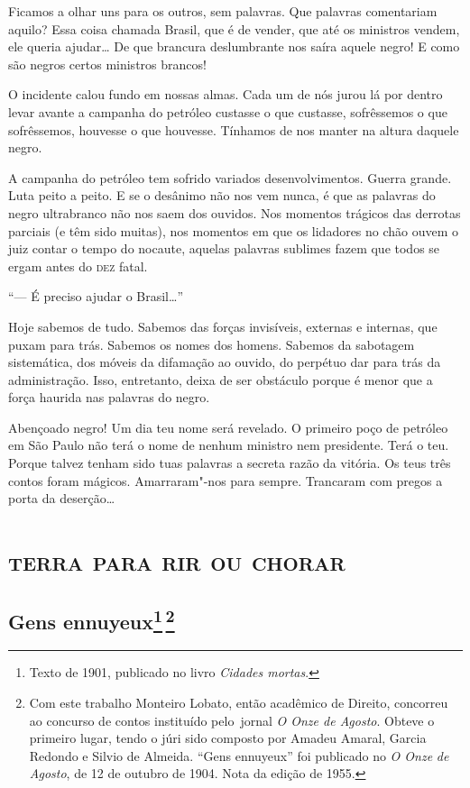 Ficamos a olhar uns para os outros, sem palavras. Que palavras
comentariam aquilo? Essa coisa chamada Brasil, que é de vender, que até
os ministros vendem, ele queria ajudar\ldots{} De que brancura deslumbrante
nos saíra aquele negro! E como são negros certos ministros brancos!

O incidente calou fundo em nossas almas. Cada um de nós jurou lá por
dentro levar avante a campanha do petróleo custasse o que custasse,
sofrêssemos o que sofrêssemos, houvesse o que houvesse. Tínhamos de nos
manter na altura daquele negro.

A campanha do petróleo tem sofrido variados desenvolvimentos. Guerra
grande. Luta peito a peito. E se o desânimo não nos vem nunca, é que as
palavras do negro ultrabranco não nos saem dos ouvidos. Nos momentos
trágicos das derrotas parciais (e têm sido muitas), nos momentos em que
os lidadores no chão ouvem o juiz contar o tempo do nocaute, aquelas
palavras sublimes fazem que todos se ergam antes do \textsc{dez} fatal.

``--- É preciso ajudar o Brasil\ldots{}''

Hoje sabemos de tudo. Sabemos das forças invisíveis, externas e
internas, que puxam para trás. Sabemos os nomes dos homens. Sabemos da
sabotagem sistemática, dos móveis da difamação ao ouvido, do perpétuo
dar para trás da administração. Isso, entretanto, deixa de ser obstáculo
porque é menor que a força haurida nas palavras do negro.

Abençoado negro! Um dia teu nome será revelado. O primeiro poço de
petróleo em São Paulo não terá o nome de nenhum ministro nem presidente.
Terá o teu. Porque talvez tenham sido tuas palavras a secreta razão da
vitória. Os teus três contos foram mágicos. Amarraram"-nos para sempre.
Trancaram com pregos a porta da deserção\ldots{}

\part{\textsc{terra para rir ou chorar}}

\chapter{Gens ennuyeux\footnote[*]{Texto de 1901, publicado no livro \emph{Cidades mortas}.}\,\footnote[**]{Com este trabalho Monteiro
  Lobato, então acadêmico de Direito, concorreu ao concurso de contos
  instituído pelo~jornal \emph{O Onze de Agosto}. Obteve o primeiro
  lugar, tendo o júri sido composto por Amadeu Amaral, Garcia Redondo e
  Silvio de Almeida. ``Gens ennuyeux'' foi publicado no \emph{O Onze}
  \emph{de Agosto}, de 12 de outubro de 1904. Nota da edição de 1955.}}

